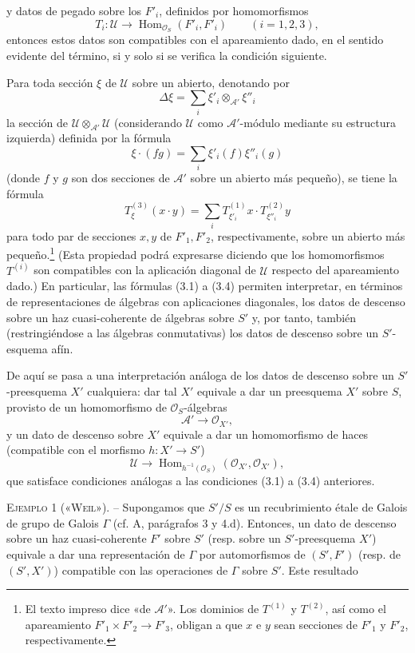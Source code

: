 y datos de pegado sobre los $F'_i$, definidos por homomorfismos
\[
  T_i:\mathcal U\longrightarrow
  \operatorname{Hom}_{\mathcal O_S}(F'_i,F'_i)
  \qquad (i=1,2,3),
\]
entonces estos datos son compatibles con el apareamiento dado, en el sentido
evidente del término, si y solo si se verifica la condición siguiente.

Para toda sección $\xi$ de $\mathcal U$ sobre un abierto, denotando por
\[
  \Delta\xi=\sum_i\xi'_i\otimes_{\mathcal A'}\xi''_i
\]
la sección de $\mathcal U\otimes_{\mathcal A'}\mathcal U$ (considerando
$\mathcal U$ como $\mathcal A'$-módulo mediante su estructura izquierda)
definida por la fórmula
\[
  \xi\mathbin{\cdot}(fg)=\sum_i\xi'_i(f)\xi''_i(g)
\]
(donde $f$ y $g$ son dos secciones de $\mathcal A'$ sobre un abierto más
pequeño), se tiene la fórmula
\begin{equation}
  T^{(3)}_\xi(x\mathbin{\cdot}y)
  =\sum_iT^{(1)}_{\xi'_i}x\mathbin{\cdot}T^{(2)}_{\xi''_i}y
  \tag{3.4}
\end{equation}
para todo par de secciones $x,y$ de $F'_1,F'_2$, respectivamente, sobre un
abierto más pequeño.\footnote{El texto impreso dice «de $\mathcal A'$». Los
dominios de $T^{(1)}$ y $T^{(2)}$, así como el apareamiento
$F'_1\times F'_2\longrightarrow F'_3$, obligan a que $x$ e $y$ sean secciones
de $F'_1$ y $F'_2$, respectivamente.} (Esta propiedad podrá expresarse
diciendo que los homomorfismos $T^{(i)}$ son compatibles con la aplicación
diagonal de $\mathcal U$ respecto del apareamiento dado.) En particular, las
fórmulas (3.1) a (3.4) permiten interpretar, en términos de representaciones de
álgebras con aplicaciones diagonales, los datos de descenso sobre un haz
cuasi-coherente de álgebras sobre $S'$ y, por tanto, también (restringiéndose a
las álgebras conmutativas) los datos de descenso sobre un $S'$-esquema afín.

De aquí se pasa a una interpretación análoga de los datos de descenso sobre un
$S'$-preesquema $X'$ cualquiera: dar tal $X'$ equivale a dar un preesquema
$X'$ sobre $S$, provisto de un homomorfismo de $\mathcal O_S$-álgebras
\[
  \mathcal A'\longrightarrow\mathcal O_{X'},
\]
y un dato de descenso sobre $X'$ equivale a dar un homomorfismo de haces
(compatible con el morfismo $h:X'\longrightarrow S'$)
\[
  \mathcal U\longrightarrow
  \operatorname{Hom}_{h^{-1}(\mathcal O_S)}
  (\mathcal O_{X'},\mathcal O_{X'}),
\]
que satisface condiciones análogas a las condiciones (3.1) a (3.4) anteriores.

\textsc{Ejemplo 1 («Weil»).} -- Supongamos que $S'/S$ es un recubrimiento étale
de Galois de grupo de Galois $\Gamma$ (cf. A, parágrafos 3 y 4.d). Entonces, un
dato de descenso sobre un haz cuasi-coherente $F'$ sobre $S'$ (resp. sobre un
$S'$-preesquema $X'$) equivale a dar una representación de $\Gamma$ por
automorfismos de $(S',F')$ (resp. de $(S',X')$) compatible con las operaciones
de $\Gamma$ sobre $S'$. Este resultado

